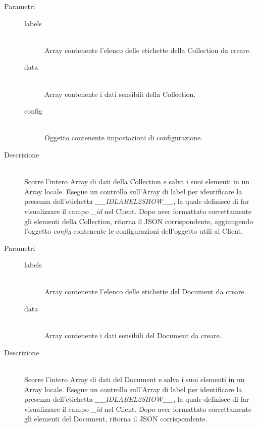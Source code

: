 \begin{description}
\begin{mldescription}
   \hfill
   \begin{description}
    \item[Parametri] \hfill
     \begin{description}
      \item[labels] \hfill \\
      Array contenente l'elenco delle etichette della Collection da creare.
      \item[data] \hfill \\
      Array contenente i dati sensibili della Collection.      
      \item[config] \hfill \\
      Oggetto contenente impostazioni di configurazione.      
     \end{description}
    \item[Descrizione] \hfill \\
    Scorre l'intero Array di dati della Collection e salva i suoi elementi in un Array locale. Esegue un controllo sull'Array di label per identificare la presenza dell'etichetta \textit{\_\_IDLABEL2SHOW\_\_}, la quale definisce di far visualizzare il campo \textit{\_id} nel Client. Dopo aver formattato correttamente gli elementi della Collection, ritorna il JSON corrispondente, aggiungendo l'oggetto \textit{config} contenente le configurazioni dell'oggetto utili al Client.
   \end{description}
   
    \hfill
   \begin{description}
    \item[Parametri] \hfill
     \begin{description}
      \item[labels] \hfill \\
      Array contenente l'elenco delle etichette del Document da creare.
      \item[data] \hfill \\
      Array contenente i dati sensibili del Document da creare.
     \end{description}
    \item[Descrizione] \hfill \\
    Scorre l'intero Array di dati del Document e salva i suoi elementi in un Array locale. Esegue un controllo sull'Array di label per identificare la presenza dell'etichetta \textit{\_\_IDLABEL2SHOW\_\_}, la quale definisce di far visualizzare il campo \textit{\_id} nel Client. Dopo aver formattato correttamente gli elementi del Document, ritorna il JSON corrispondente.
   \end{description}
   

\end{mldescription}
\end{description}
